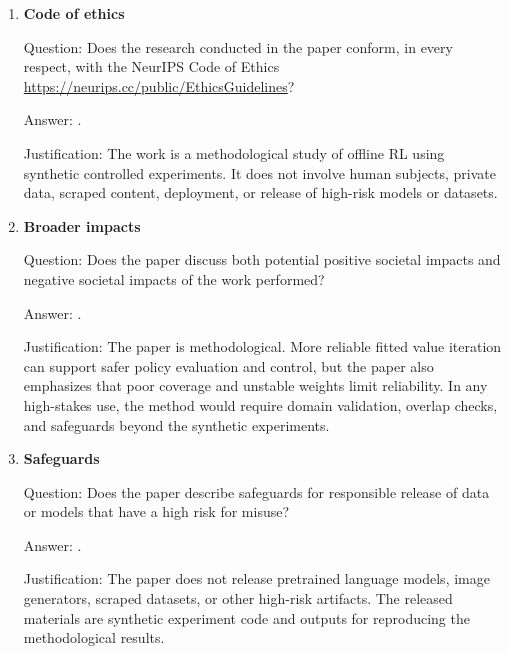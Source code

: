 \documentclass{article}
\theoremstyle{plain}
\theoremstyle{definition}
\theoremstyle{remark}
\begin{document}
\begin{enumerate}[leftmargin=5mm]
Question: For each experiment, does the paper provide sufficient information on
the computer resources needed to reproduce the experiments?

Answer: \answerYes{}.

Justification: The experiments are controlled synthetic simulations using
finite-dimensional linear/RBF-polynomial features, closed-form or small
saddle-point estimators, and no pretrained models or large-scale distributed
training. The paper reports the sample sizes, iteration counts, number of
datasets, feature classes, and stabilization rules that determine computational
scale; the accompanying scripts provide executable configurations.

\item \textbf{Code of ethics}

Question: Does the research conducted in the paper conform, in every respect,
with the NeurIPS Code of Ethics
\url{https://neurips.cc/public/EthicsGuidelines}?

Answer: \answerYes{}.

Justification: The work is a methodological study of offline RL using
synthetic controlled experiments. It does not involve human subjects, private
data, scraped content, deployment, or release of high-risk models or datasets.

\item \textbf{Broader impacts}

Question: Does the paper discuss both potential positive societal impacts and
negative societal impacts of the work performed?

Answer: \answerYes{}.

Justification: The paper is methodological. More reliable fitted value
iteration can support safer policy evaluation and control, but the paper also
emphasizes that poor coverage and unstable weights limit reliability. In any
high-stakes use, the method would require domain validation, overlap checks,
and safeguards beyond the synthetic experiments.

\item \textbf{Safeguards}

Question: Does the paper describe safeguards for responsible release of data or
models that have a high risk for misuse?

Answer: \answerNA{}.

Justification: The paper does not release pretrained language models, image
generators, scraped datasets, or other high-risk artifacts. The released
materials are synthetic experiment code and outputs for reproducing the
methodological results.


\end{enumerate}
\end{document}
